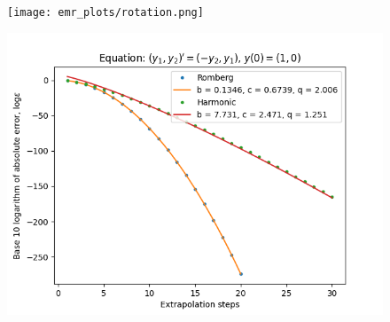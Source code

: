 \begin{figure}[H]
\centering
\begin{minipage}{0.45\textwidth}
\centering
\texttt{[image: emr\_plots/rotation.png]}
\end{minipage}
\begin{minipage}{0.45\textwidth}
\centering
\includegraphics[scale=0.45]{emr_plots/rotation_hp_steps.png}
\end{minipage}
\end{figure}

